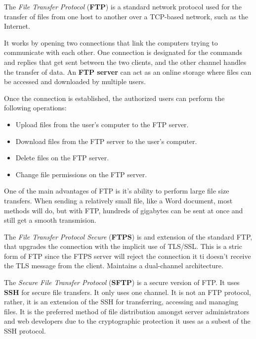 The \textit{File Transfer Protocol} (\textbf{FTP}) is a standard network protocol used for the transfer of files from one host to another over a TCP-based network, such as the Internet.

It works by opening two connections that link the computers trying to communicate with each other. One connection is designated for the commands and replies that get sent between the two clients, and the other channel handles the transfer of data. An \textbf{FTP server} can act as an online storage where files can be accessed and downloaded by multiple users.

Once the connection is established, the authorized users can perform the following operations:

\begin{itemize}
  \item Upload files from the user's computer to the FTP server.
  \item Download files from the FTP server to the user's computer.
  \item Delete files on the FTP server.
  \item Change file permissions on the FTP server.
\end{itemize}

One of the main advantages of FTP is it's ability to perform large file size transfers. When sending a relatively small file, like a Word document, most methods will do, but with FTP, hundreds of gigabytes can be sent at once and still get a smooth transmision.

The \textit{File Transfer Protocol Secure} (\textbf{FTPS}) is and extension of the standard FTP, that upgrades the connection with the implicit use of TLS/SSL. This is a stric form of FTP since the FTPS server will reject the connection it ti doesn't receive the TLS message from the client. Maintains a dual-channel architecture.

The \textit{Secure File Transfer Protocol} (\textbf{SFTP}) is a secure version of FTP. It uses \textbf{SSH} for secure file transfers. It only uses one channel. It is not an FTP protocol, rather, it is an extension of the SSH for transferring, accessing and managing files. It is the preferred method of file distribution amongst server administrators and web developers due to the cryptographic protection it uses as a subest of the SSH protocol.
